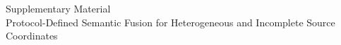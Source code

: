 \documentclass[preprint,12pt]{elsarticle}
\begin{document}
\begin{center}
{\Large Supplementary Material}\\[0.5em]
{\large Protocol-Defined Semantic Fusion for Heterogeneous and Incomplete Source Coordinates}
\end{center}


\end{document}
